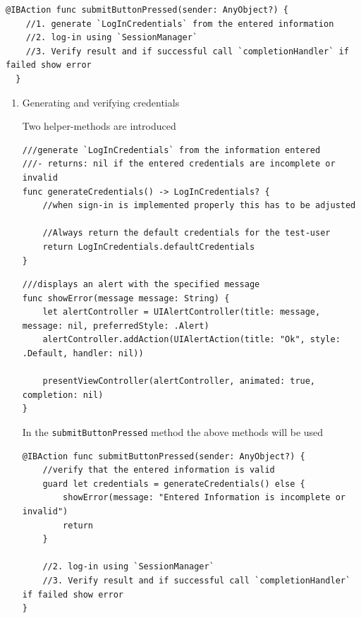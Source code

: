 \documentclass{article}
\begin{document}
\begin{verbatim}
@IBAction func submitButtonPressed(sender: AnyObject?) {
    //1. generate `LogInCredentials` from the entered information
    //2. log-in using `SessionManager`
    //3. Verify result and if successful call `completionHandler` if failed show error
  }
\end{verbatim}
\begin{enumerate}
\item{Generating and verifying credentials}\label{generating-and-verifying-credentials}

Two helper-methods are introduced

\begin{verbatim}
///generate `LogInCredentials` from the information entered
///- returns: nil if the entered credentials are incomplete or invalid
func generateCredentials() -> LogInCredentials? {
    //when sign-in is implemented properly this has to be adjusted

    //Always return the default credentials for the test-user
    return LogInCredentials.defaultCredentials
}
\end{verbatim}

\begin{verbatim}
///displays an alert with the specified message
func showError(message message: String) {
    let alertController = UIAlertController(title: message, message: nil, preferredStyle: .Alert)
    alertController.addAction(UIAlertAction(title: "Ok", style: .Default, handler: nil))

    presentViewController(alertController, animated: true, completion: nil)
}
\end{verbatim}

In the \texttt{submitButtonPressed} method the above methods will be
used

\begin{verbatim}
@IBAction func submitButtonPressed(sender: AnyObject?) {
    //verify that the entered information is valid
    guard let credentials = generateCredentials() else {
        showError(message: "Entered Information is incomplete or invalid")
        return
    }

    //2. log-in using `SessionManager`
    //3. Verify result and if successful call `completionHandler` if failed show error
}
\end{verbatim}


\end{enumerate}
\end{document}
